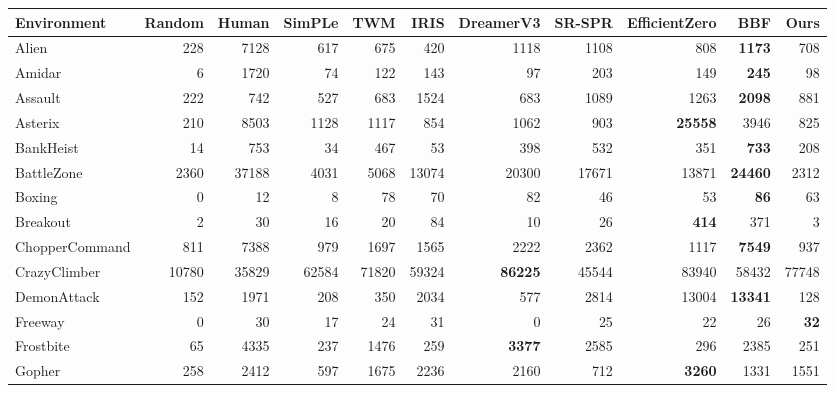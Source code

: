 \begin{tabular}{l|rr|rrrrrrr|r}
    \toprule
    Environment    & Random & Human & SimPLe & TWM   & IRIS  & DreamerV3 & SR-SPR      & EfficientZero & BBF       & Ours     \\
    \midrule
    Alien          & 228    & 7128  & 617    & 675   & 420   & 1118      & 1108        & 808           & \bf 1173  & 708      \\
    Amidar         & 6      & 1720  & 74     & 122   & 143   & 97        & 203         & 149           & \bf 245   & 98       \\
    Assault        & 222    & 742   & 527    & 683   & 1524  & 683       & 1089        & 1263          & \bf 2098  & 881      \\
    Asterix        & 210    & 8503  & 1128   & 1117  & 854   & 1062      & 903         & \bf 25558     & 3946      & 825      \\
    BankHeist      & 14     & 753   & 34     & 467   & 53    & 398       & 532         & 351           & \bf 733   & 208      \\
    BattleZone     & 2360   & 37188 & 4031   & 5068  & 13074 & 20300     & 17671       & 13871         & \bf 24460 & 2312     \\
    Boxing         & 0      & 12    & 8      & 78    & 70    & 82        & 46          & 53            & \bf 86    & 63       \\
    Breakout       & 2      & 30    & 16     & 20    & 84    & 10        & 26          & \bf 414       & 371       & 3        \\
    ChopperCommand & 811    & 7388  & 979    & 1697  & 1565  & 2222      & 2362        & 1117          & \bf 7549  & 937      \\
    CrazyClimber   & 10780  & 35829 & 62584  & 71820 & 59324 & \bf 86225 & 45544       & 83940         & 58432     & 77748    \\
    DemonAttack    & 152    & 1971  & 208    & 350   & 2034  & 577       & 2814        & 13004         & \bf 13341 & 128      \\
    Freeway        & 0      & 30    & 17     & 24    & 31    & 0         & 25          & 22            & 26        & \bf 32   \\
    Frostbite      & 65     & 4335  & 237    & 1476  & 259   & \bf 3377  & 2585        & 296           & 2385      & 251      \\
    Gopher         & 258    & 2412  & 597    & 1675  & 2236  & 2160      & 712         & \bf 3260      & 1331      & 1551     \\

\end{tabular}
